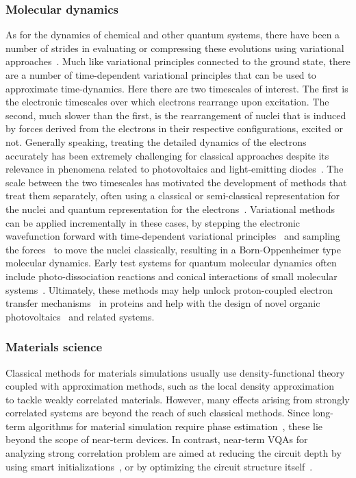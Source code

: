 \documentclass[prx,twocolumn,floatfix,superscriptaddress,longbibliography]{revtex4-1}
\newcommand{\<}{\langle}
\renewcommand{\>}{\rangle}
\begin{document}
\subsubsection{Molecular dynamics} As for  the dynamics of chemical and other quantum systems, there have been a number of strides in evaluating or compressing these evolutions using variational approaches~\cite{li2017efficient,yuan2019theory}.  Much like variational principles connected to the ground state, there are a number of time-dependent variational principles that can be used to approximate time-dynamics. Here there are two timescales of interest.  The first is the electronic timescales over which electrons rearrange upon excitation.  The second, much slower than the first, is the rearrangement of nuclei that is induced by forces derived from the electrons in their respective configurations, excited or not.  Generally speaking, treating the detailed dynamics of the electrons accurately has been extremely challenging for classical approaches despite its relevance in phenomena related to photovoltaics and light-emitting diodes~\cite{bakulin2013charge,gross2000improving}.  The scale between the two  timescales has motivated the development of methods that treat them separately, often using a classical or semi-classical representation for the nuclei and quantum representation for the electrons~\cite{schmidt2008mixed}.  Variational methods can be applied incrementally in these cases, by stepping the electronic wavefunction forward with time-dependent variational principles~\cite{li2017efficient,yuan2019theory} and sampling the forces~\cite{o2019calculating} to move the nuclei classically, resulting in a Born-Oppenheimer type molecular dynamics.   Early test systems for quantum molecular dynamics often include photo-dissociation reactions and conical interactions of small molecular systems~\cite{tully1971trajectory}.  Ultimately, these methods may help unlock proton-coupled electron transfer mechanisms~\cite{weinberg2012proton} in proteins and help with the design of novel organic photovoltaics~\cite{bakulin2013charge} and related systems.



\subsubsection{Materials science} Classical methods for materials simulations usually use density-functional theory coupled with approximation methods, such as the  local density approximation~\cite{kohn1965self} to tackle weakly correlated materials. However, many effects arising from strongly correlated systems are beyond the reach of such classical methods. Since long-term algorithms for material simulation require phase estimation~\cite{bauer2016hybrid,babbush2018encoding,berry2018improved}, these lie beyond the scope of near-term devices. In contrast, near-term VQAs for analyzing strong correlation problem are aimed at reducing the circuit depth by using smart initializations~\cite{dallaire2018low}, or by optimizing the circuit structure itself~\cite{grimsley2019adaptive,tang2019qubit}. 
\end{document}
